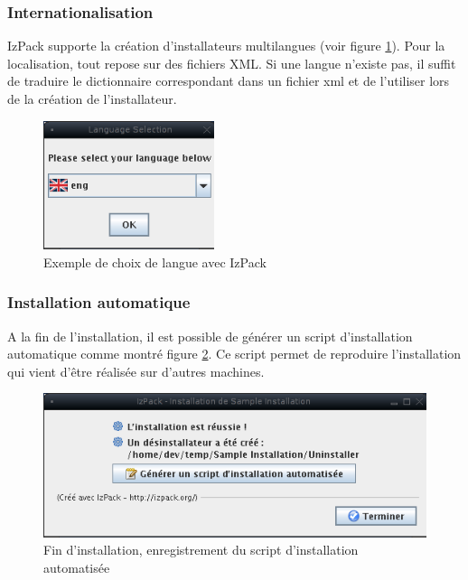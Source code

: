 \subsubsection{Internationalisation}
IzPack supporte la création d'installateurs multilangues (voir figure \ref{fig:LangChoice}).
Pour la localisation, tout repose sur des fichiers XML.
Si une langue n'existe pas, il suffit de traduire le dictionnaire correspondant dans un fichier xml et de l'utiliser lors de la création de l'installateur.
\begin{figure}[H]
	\centering
	\includegraphics[width=5cm]{../image/LangChoice.png}
	\caption{Exemple de choix de langue avec IzPack}
	\label{fig:LangChoice}
\end{figure}
\subsubsection{Installation automatique}
A la fin de l'installation, il est possible de générer un script d'installation automatique comme montré figure \ref{fig:SaveInstallXML}.
Ce script permet de reproduire l'installation qui vient d'être réalisée sur d'autres machines.
\begin{figure}[H]
	\centering
	\includegraphics[width=12cm]{../image/SaveInstallXML.png}
	\caption{Fin d'installation, enregistrement du script d'installation automatisée}
	\label{fig:SaveInstallXML}
\end{figure}
